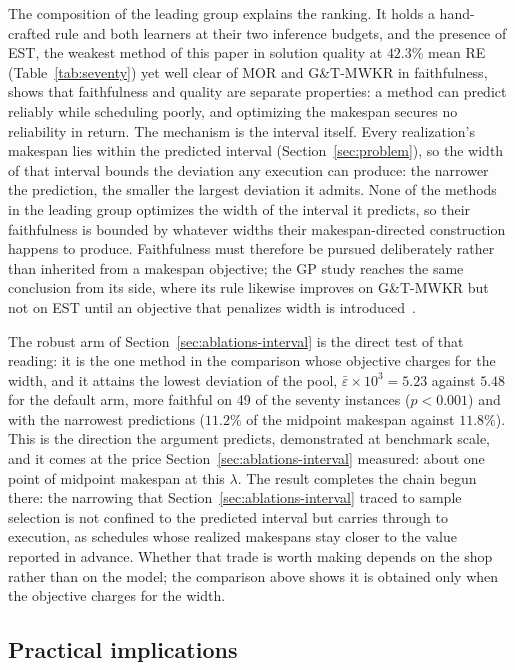 \documentclass[preprint,authoryear,12pt]{elsarticle}
\theoremstyle{definition}
\theoremstyle{remark}
\begin{document}
The composition of the leading group explains the ranking. It holds a
hand-crafted rule and both learners at their two inference budgets,
and the presence of EST, the weakest method of this paper
in solution quality at $42.3\%$ mean RE
(Table~\ref{tab:seventy}) yet well clear of MOR and G\&T-MWKR in
faithfulness, shows that faithfulness and quality are separate
properties: a method can predict reliably while scheduling poorly,
and optimizing the makespan secures no reliability in return.
The mechanism is the interval itself. Every realization's makespan
lies within the predicted interval (Section~\ref{sec:problem}), so
the width of that interval bounds the deviation any execution can
produce: the narrower the prediction, the smaller the largest
deviation it admits. None of the methods in the leading group optimizes
the width of the interval it predicts, so their faithfulness is
bounded by whatever widths their makespan-directed construction
happens to produce. Faithfulness must therefore be pursued
deliberately rather than inherited from a makespan objective; the GP
study reaches the same conclusion from its side, where its rule
likewise improves on G\&T-MWKR but not on EST until an objective that
penalizes width is introduced~\citep{DiazGP2026}.

The robust arm of Section~\ref{sec:ablations-interval} is the direct
test of that reading: it is the one method in the comparison whose
objective charges for the width, and it attains the lowest deviation
of the pool, $\bar\varepsilon\times10^{3}=5.23$ against $5.48$ for
the default arm, more faithful on 49 of the seventy instances
($p<0.001$) and with the narrowest predictions ($11.2\%$ of the
midpoint makespan against $11.8\%$). This is the direction the
argument predicts, demonstrated at benchmark scale, and it comes at
the price Section~\ref{sec:ablations-interval} measured: about one
point of midpoint makespan at this $\lambda$. The result completes the chain begun there: the
narrowing that Section~\ref{sec:ablations-interval} traced to sample
selection is not confined to the predicted interval but carries
through to execution, as schedules whose realized makespans stay
closer to the value reported in advance. Whether that trade is worth
making depends on the shop rather than on the model; the comparison
above shows it is obtained only when the objective charges for the
width.


\subsection{Practical implications}
\label{sec:practical}
\end{document}
